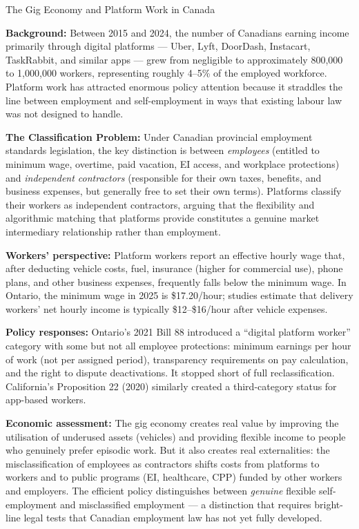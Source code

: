 \begin{casestudy}{The Gig Economy and Platform Work in Canada}

\textbf{Background:} Between 2015 and 2024, the number of Canadians
earning income primarily through digital platforms --- Uber, Lyft, DoorDash,
Instacart, TaskRabbit, and similar apps --- grew from negligible to
approximately 800{,}000 to 1{,}000{,}000 workers, representing roughly
4--5\% of the employed workforce. Platform work has attracted enormous
policy attention because it straddles the line between employment and
self-employment in ways that existing labour law was not designed to handle.

\textbf{The Classification Problem:} Under Canadian provincial employment
standards legislation, the key distinction is between \textit{employees}
(entitled to minimum wage, overtime, paid vacation, EI access, and workplace
protections) and \textit{independent contractors} (responsible for their
own taxes, benefits, and business expenses, but generally free to set
their own terms). Platforms classify their workers as independent contractors,
arguing that the flexibility and algorithmic matching that platforms provide
constitutes a genuine market intermediary relationship rather than employment.

\textbf{Workers' perspective:} Platform workers report an effective hourly
wage that, after deducting vehicle costs, fuel, insurance (higher for
commercial use), phone plans, and other business expenses, frequently falls
below the minimum wage. In Ontario, the minimum wage in 2025 is \$17.20/hour;
studies estimate that delivery workers' net hourly income is typically
\$12--\$16/hour after vehicle expenses.

\textbf{Policy responses:} Ontario's 2021 Bill 88 introduced a ``digital
platform worker'' category with some but not all employee protections:
minimum earnings per hour of work (not per assigned period), transparency
requirements on pay calculation, and the right to dispute deactivations.
It stopped short of full reclassification. California's Proposition 22
(2020) similarly created a third-category status for app-based workers.

\textbf{Economic assessment:} The gig economy creates real value by
improving the utilisation of underused assets (vehicles) and providing
flexible income to people who genuinely prefer episodic work. But it also
creates real externalities: the misclassification of employees as contractors
shifts costs from platforms to workers and to public programs (EI, healthcare,
CPP) funded by other workers and employers. The efficient policy
distinguishes between \textit{genuine} flexible self-employment and
misclassified employment --- a distinction that requires bright-line
legal tests that Canadian employment law has not yet fully developed.
\end{casestudy}

